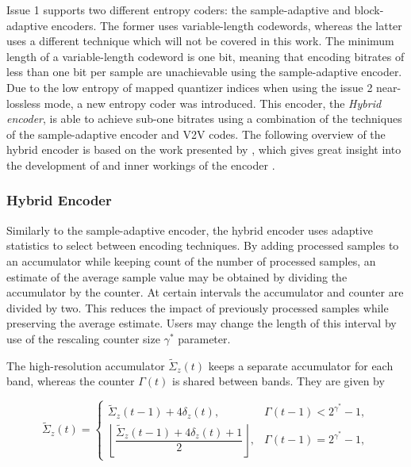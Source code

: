 Issue 1 supports two different entropy coders: the sample-adaptive and block-adaptive encoders. The former uses variable-length codewords, whereas the latter uses a different technique which will not be covered in this work. The minimum length of a variable-length codeword is one bit, meaning that encoding bitrates of less than one bit per sample are unachievable using the sample-adaptive encoder. Due to the low entropy of mapped quantizer indices when using the issue 2 near-lossless mode, a new entropy coder was introduced. This encoder, the \textit{Hybrid encoder}, is able to achieve sub-one bitrates using a combination of the techniques of the sample-adaptive encoder and \acrfull{V2V} codes. The following overview of the hybrid encoder is based on the work presented by \citeauthor{blanesHYBRIDENTROPYENCODER}, which gives great insight into the development of and inner workings of the encoder \cite{blanesHYBRIDENTROPYENCODER}.

\subsubsection{Hybrid Encoder}

Similarly to the sample-adaptive encoder, the hybrid encoder uses adaptive statistics to select between encoding techniques. By adding processed samples to an accumulator while keeping count of the number of processed samples, an estimate of the average sample value may be obtained by dividing the accumulator by the counter. At certain intervals the accumulator and counter are divided by two. This reduces the impact of previously processed samples while preserving the average estimate. Users may change the length of this interval by use of the rescaling counter size $\gamma^*$ parameter.

The high-resolution accumulator $\tilde{\Sigma}_z(t)$ keeps a separate accumulator for each band, whereas the counter $\Gamma(t)$ is shared between bands. They are given by

\begin{equation}
	\tilde{\Sigma}_z(t) =
	\begin{cases}
		\tilde{\Sigma}_z(t-1) + 4\delta_z(t),                                           & \Gamma(t-1) < 2^{\gamma^*} - 1, \\
		\left\lfloor \dfrac{\tilde{\Sigma}_z(t-1) + 4\delta_z(t) + 1}{2} \right\rfloor, & \Gamma(t-1) = 2^{\gamma^*} - 1,
	\end{cases}
	\label{eq:accumulator}
\end{equation}

